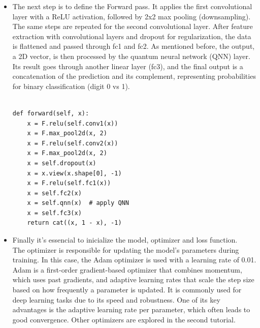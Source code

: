 \documentclass[conference]{IEEEtran}
\begin{document}
\begin{itemize}
{\small
\begin{verbatim}

class Net(Module):
def __init__(self, qnn):
    super().__init__()
    self.conv1 = 
    Conv2d(1, 2, kernel_size=5)
    self.conv2 = 
    Conv2d(2, 16, kernel_size=5)
    self.dropout = 
    Dropout2d()
    self.fc1 = 
    Linear(256, 64)
    self.fc2 = 
    Linear(64, 2) 
    self.qnn 
    = TorchConnector(qnn) 
    self.fc3 = Linear(1, 1)  

\end{verbatim}
}

        \item The next step is to define the Forward pass.
        It applies the first convolutional layer with a ReLU \cite{pytorch_relu} activation, followed by 2x2 max pooling (downsampling). The same steps are repeated for the second convolutional layer.
        After feature extraction with convolutional layers and dropout for regularization, the data is flattened and passed through fc1 and fc2. As mentioned before, the output, a 2D vector, is then processed by the quantum neural network (QNN) layer. Its result goes through another linear layer (fc3), and the final output is a concatenation of the prediction and its complement, representing probabilities for binary classification (digit 0 vs 1).
{\small
\begin{verbatim}

def forward(self, x):
    x = F.relu(self.conv1(x))
    x = F.max_pool2d(x, 2)
    x = F.relu(self.conv2(x))
    x = F.max_pool2d(x, 2)
    x = self.dropout(x)
    x = x.view(x.shape[0], -1)
    x = F.relu(self.fc1(x))
    x = self.fc2(x)
    x = self.qnn(x)  # apply QNN
    x = self.fc3(x)
    return cat((x, 1 - x), -1)

\end{verbatim}}


        \item Finally it's essencial to inicialize the model, optimizer and loss function.\\
        

        The optimizer is responsible for updating the model's parameters during training. In this case, the Adam optimizer \cite{pytorch_adam} is used with a learning rate of 0.01.
        Adam is a first-order gradient-based optimizer that combines momentum, which uses past gradients, and adaptive learning rates that scale the step size based on how frequently a parameter is updated. It is commonly used for deep learning tasks due to its speed and robustness. One of its key advantages is the adaptive learning rate per parameter, which often leads to good convergence. Other optimizers are explored in the second tutorial.\\



\end{itemize}
\end{document}
